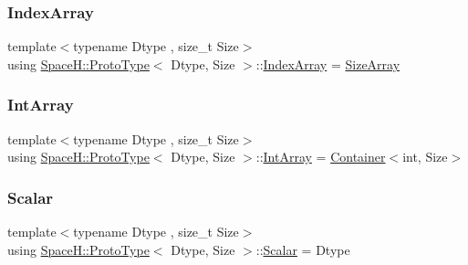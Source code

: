 \subsubsection{\texorpdfstring{Index\+Array}{IndexArray}}
{\footnotesize\ttfamily template$<$typename Dtype , size\+\_\+t Size$>$ \\
using \mbox{\hyperlink{struct_space_h_1_1_proto_type}{Space\+H\+::\+Proto\+Type}}$<$ Dtype, Size $>$\+::\mbox{\hyperlink{struct_space_h_1_1_proto_type_a276a37c81faf08681b57e8082f3f6c1b}{Index\+Array}} =  \mbox{\hyperlink{struct_space_h_1_1_proto_type_abb1c3c7a06f24576cc47636441331972}{Size\+Array}}}

\mbox{\label{struct_space_h_1_1_proto_type_ad9105b93d029a9d231bc31ddcfd7dbd9}} 
\subsubsection{\texorpdfstring{Int\+Array}{IntArray}}
{\footnotesize\ttfamily template$<$typename Dtype , size\+\_\+t Size$>$ \\
using \mbox{\hyperlink{struct_space_h_1_1_proto_type}{Space\+H\+::\+Proto\+Type}}$<$ Dtype, Size $>$\+::\mbox{\hyperlink{struct_space_h_1_1_proto_type_ad9105b93d029a9d231bc31ddcfd7dbd9}{Int\+Array}} =  \mbox{\hyperlink{struct_space_h_1_1_proto_type_a60ee86c74f6f9ebfa78936f6dc1d2b07}{Container}}$<$int, Size$>$}

\mbox{\label{struct_space_h_1_1_proto_type_af3c8245d83d9db64749882920de5c274}} 
\subsubsection{\texorpdfstring{Scalar}{Scalar}}
{\footnotesize\ttfamily template$<$typename Dtype , size\+\_\+t Size$>$ \\
using \mbox{\hyperlink{struct_space_h_1_1_proto_type}{Space\+H\+::\+Proto\+Type}}$<$ Dtype, Size $>$\+::\mbox{\hyperlink{struct_space_h_1_1_proto_type_af3c8245d83d9db64749882920de5c274}{Scalar}} =  Dtype}

\mbox{\label{struct_space_h_1_1_proto_type_a09ef91dc8a37a044c403f5a833044725}} 
